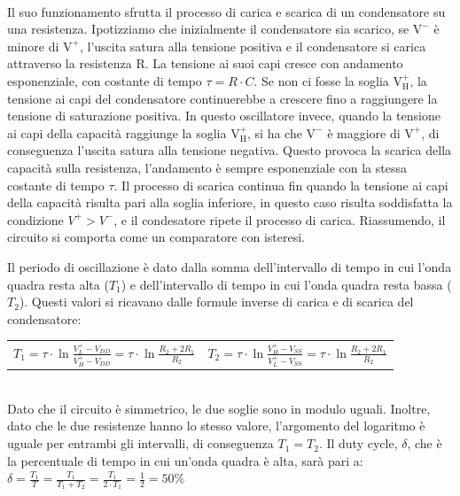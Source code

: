 \documentclass{report}
\begin{document}
\\Il suo funzionamento sfrutta il processo di carica e scarica di un condensatore su una resistenza. Ipotizziamo che inizialmente il condensatore sia scarico, se $\mathrm{V^-}$ è minore di $\mathrm{V^+}$, l'uscita satura alla tensione positiva e il condensatore si carica attraverso la resistenza $\mathrm{R}$. La tensione ai suoi capi cresce con andamento esponenziale, con costante di tempo $\displaystyle{\tau=R\cdot C}$. Se non ci fosse la soglia $\mathrm{V_H^+}$, la tensione ai capi del condensatore continuerebbe a crescere fino a raggiungere la tensione di saturazione positiva. In questo oscillatore invece, quando la tensione ai capi della capacità raggiunge la soglia $\mathrm{V_H^+}$, si ha che $\mathrm{V^-}$ è maggiore di $\mathrm{V^+}$, di conseguenza l'uscita satura alla tensione negativa. Questo provoca la scarica della capacità sulla resistenza, l'andamento è sempre esponenziale con la stessa costante di tempo $\tau$. Il processo di scarica continua fin quando la tensione ai capi della capacità risulta pari alla soglia inferiore, in questo caso risulta soddisfatta la condizione $V^+>V^-$, e il condesatore ripete il processo di carica. Riassumendo, il circuito si comporta come un comparatore con isteresi.\par
Il periodo di oscillazione è dato dalla somma dell'intervallo di tempo in cui l'onda quadra resta alta ($T_1$) e dell'intervallo di tempo in cui l'onda quadra resta bassa ($T_2$). Questi valori si ricavano dalle formule inverse di carica e di scarica del condensatore:
\begin{table}[h!]
	\centering
	\begin{tabular}{cc}
		$\displaystyle{T_1=\tau\cdot\ln\frac{V_L^+-V_{DD}}{V_H^+-V_{DD}}=\tau\cdot\ln\frac{R_2+2R_1}{R_2}}$\;\;\;\;\;\;\;\;\;\;\;\;\; & $\displaystyle{T_2=\tau\cdot\ln\frac{V_H^+-V_{SS}}{V_L^+-V_{SS}}=\tau\cdot\ln\frac{R_2+2R_1}{R_2}}$\\ 
	\end{tabular}
	\label{table:formuleSoglie}
\end{table}
\\Dato che il circuito è simmetrico, le due soglie sono in modulo uguali. Inoltre, dato che le due resistenze hanno lo stesso valore, l'argomento del logaritmo è uguale per entrambi gli intervalli, di conseguenza $T_1=T_2$. Il duty cycle, $\delta$, che è la percentuale di tempo in cui un'onda quadra è alta, sarà pari a:
\\[4pt]\indent$\displaystyle{\delta=\frac{T_1}{T}=\frac{T_1}{T_1+T_2}=\frac{T_1}{2\cdot T_1}=\frac{1}{2}=50\%}$
\end{document}
